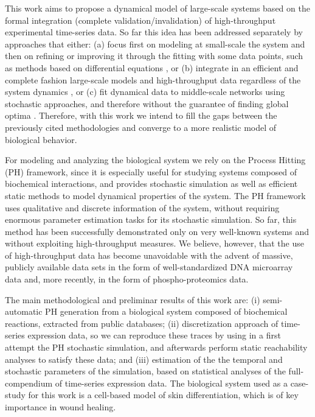 \documentclass[11pt,a4paper,twoside]{epig}
\begin{document}
This work aims to propose a dynamical model of large-scale systems based on the formal integration 
(complete validation/invalidation) of high-throughput experimental time-series data.  So far this 
idea has been addressed separately by approaches that either: (a) focus first on
modeling at small-scale the system and then on refining or improving it through the fitting with
some data points, such as methods based on differential equations \cite{tyson2003sniffers,batt2005validation,mobashir2012simulated}, or (b) integrate in an efficient and complete fashion large-scale models
and high-throughput data regardless of the system dynamics \cite{guziolowski2013exhaustively,mitsos2009identifying}, or 
(c) fit dynamical data to middle-scale networks using stochastic approaches, and
therefore without the guarantee of finding global optima \cite{macnamara2012state}. Therefore, with this
work we intend to fill the gaps between the previously cited methodologies and converge to a more
realistic model of biological behavior.

For modeling and analyzing the biological system we rely on the Process Hitting (PH) framework\cite{PMR10-TCSB}, 
since it is especially useful for studying systems composed of biochemical interactions, and provides
stochastic simulation as well as efficient static methods to model dynamical properties of the system.
The PH framework uses qualitative and discrete information of the system, without requiring enormous parameter estimation tasks
 for its stochastic simulation. 
So far, this method has been successfully demonstrated only on very well-known systems and without exploiting 
high-throughput measures. We believe, however, that the use of high-throughput data has become unavoidable with 
the advent of massive, publicly available data sets in the form of well-standardized DNA microarray data and, 
more recently, in the form of phospho-proteomics data.  

The main methodological and preliminar results of this work are: (i) semi-automatic PH generation 
from a biological system composed of biochemical reactions, extracted from public databases;
(ii) discretization approach of time-series expression data, so we can 
reproduce these traces by using in a first attempt the PH stochastic simulation, and afterwards 
perform static reachability analyses to satisfy these data; and (iii) estimation of the the temporal and stochastic
parameters of the simulation, based on statistical analyses of the full-compendium of time-series expression data.
The biological system used as a case-study for this work is a cell-based model of skin differentiation, which 
is of key importance in  wound healing. 
\end{document}
